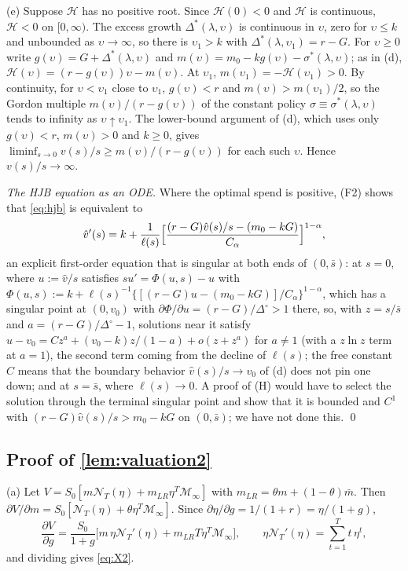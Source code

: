 (e) Suppose $\mathcal H$ has no positive root. Since $\mathcal H(0)<0$ and $\mathcal H$ is continuous, $\mathcal H<0$ on $[0,\infty)$. The excess growth $\Delta^*(\lambda,\upsilon)$ is continuous in $\upsilon$, zero for $\upsilon\le k$ and unbounded as $\upsilon\to\infty$, so there is $\upsilon_1>k$ with $\Delta^*(\lambda,\upsilon_1)=r-G$. For $\upsilon\ge0$ write $g(\upsilon)=G+\Delta^*(\lambda,\upsilon)$ and $m(\upsilon)=m_0-kg(\upsilon)-\sigma^*(\lambda,\upsilon)$; as in (d), $\mathcal H(\upsilon)=(r-g(\upsilon))\upsilon-m(\upsilon)$. At $\upsilon_1$, $m(\upsilon_1)=-\mathcal H(\upsilon_1)>0$. By continuity, for $\upsilon<\upsilon_1$ close to $\upsilon_1$, $g(\upsilon)<r$ and $m(\upsilon)>m(\upsilon_1)/2$, so the Gordon multiple $m(\upsilon)/(r-g(\upsilon))$ of the constant policy $\sigma\equiv\sigma^*(\lambda,\upsilon)$ tends to infinity as $\upsilon\uparrow\upsilon_1$. The lower-bound argument of (d), which uses only $g(\upsilon)<r$, $m(\upsilon)>0$ and $k\ge 0$, gives $\liminf_{s\to0}v(s)/s\ge m(\upsilon)/(r-g(\upsilon))$ for each such $\upsilon$. Hence $v(s)/s\to\infty$.

\emph{The HJB equation as an ODE.} Where the optimal spend is positive, (F2) shows that \eqref{eq:hjb} is equivalent to
\[
\hat v'(s)=k+\frac{1}{\ell(s)}\Bigl[\frac{(r-G)\hat v(s)/s-(m_0-kG)}{C_\alpha}\Bigr]^{1-\alpha},
\]
an explicit first-order equation that is singular at both ends of $(0,\bar s)$: at $s=0$, where $u:=\hat v/s$ satisfies $su'=\Phi(u,s)-u$ with $\Phi(u,s):=k+\ell(s)^{-1}\{[(r-G)u-(m_0-kG)]/C_\alpha\}^{1-\alpha}$, which has a singular point at $(0,v_0)$ with $\partial\Phi/\partial u=(r-G)/\Delta^\circ>1$ there, so, with $z=s/\bar s$ and $a=(r-G)/\Delta^\circ-1$, solutions near it satisfy $u-v_0=Cz^{a}+(v_0-k)z/(1-a)+o(z+z^{a})$ for $a\neq1$ (with a $z\ln z$ term at $a=1$), the second term coming from the decline of $\ell(s)$; the free constant $C$ means that the boundary behavior $\hat v(s)/s\to v_0$ of (d) does not pin one down; and at $s=\bar s$, where $\ell(s)\to0$. A proof of (H) would have to select the solution through the terminal singular point and show that it is bounded and $C^1$ with $(r-G)\hat v(s)/s>m_0-kG$ on $(0,\bar s)$; we have not done this. \qed

\subsection*{Proof of \autoref{lem:valuation2}}

(a) Let $V=S_0[m\mathcal N_T(\eta)+m_{LR}\eta^T\mathcal M_\infty]$ with $m_{LR}=\theta m+(1-\theta)\bar m$. Then $\partial V/\partial m=S_0[\mathcal N_T(\eta)+\theta\eta^T\mathcal M_\infty]$. Since $\partial\eta/\partial g=1/(1+r)=\eta/(1+g)$,
\[
\frac{\partial V}{\partial g}=\frac{S_0}{1+g}\bigl[m\,\eta\mathcal N_T'(\eta)+m_{LR}T\eta^T\mathcal M_\infty\bigr],\qquad \eta\mathcal N_T'(\eta)=\sum_{t=1}^Tt\,\eta^t,
\]
and dividing gives \eqref{eq:X2}.

